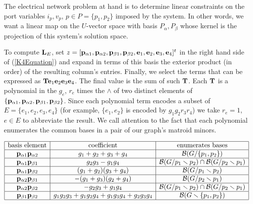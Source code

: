 The electrical network problem at hand is to determine linear constraints on the
port variables $i_p, v_p$, $p\in P = \{p_1, p_2\}$ imposed by the system.  In other words,
we want a linear map on the $U$-vector space with basis $P_\alpha, P_\beta$ whose kernel
is the projection of this system's solution space.

To compute $\mathbf{L}_E$, set 
$z=[\mathbf{p}_{\alpha 1},\mathbf{p}_{\alpha 2},\mathbf{p}_{\beta 1},\mathbf{p}_{\beta 2},
  \mathbf{e}_1,  \mathbf{e}_2,  \mathbf{e}_3,  \mathbf{e}_4]^t$
in the right hand side of (\ref{K4Equation}) 
and expand in terms of this basis
the exterior product (in order) of the resulting column's entries.
Finally, we select
the terms that can be expressed as $\mathbf{T}\mathbf{e}_1\mathbf{e}_2\mathbf{e}_3\mathbf{e}_4$.  The final
value is the sum of such $\mathbf{T}$.  Each $\mathbf{T}$ is a polynomial in the $g_e$, $r_e$
times the $\wedge$ of two distinct elements of
$\{\mathbf{p}_{\alpha 1}, \mathbf{p}_{\alpha 2}, \mathbf{p}_{\beta 1}, \mathbf{p}_{\beta 2}\}$.  Since each polynomial
term encodes a subset of $E=\{e_1, e_2, e_3, e_4\}$ (for example, $\{e_1, e_2\}$ is encoded
by $g_1g_2r_3r_4$) we take $r_e=1$, $e\in E$ to abbreviate the result. We call attention
to the fact that each polynomial enumerates
the common bases in a pair of our graph's matroid minors.


\begin{equation}\label{K4table}
\begin{array}{|c|c|c|} \hline
\text{basis element} & \text{coefficient} & \text{enumerates bases}\\
  \hline

\mathbf{p}_{\alpha 1}\mathbf{p}_{\alpha 2} &
g_1 + g_2 + g_3 + g_4 & \mathcal{B}(G/\{p_1, p_2\})

\\ \hline

\mathbf{p}_{\alpha 1}\mathbf{p}_{\beta 1} &
g_2g_3 - g_1g_4 &  \mathcal{B}(G/p_1\smallsetminus p_2)\cap\mathcal{B}(G/p_2\smallsetminus p_1)

\\ \hline

\mathbf{p}_{\alpha 1}\mathbf{p}_{\beta 2} &
(g_1 + g_2)(g_3 + g_4) & \mathcal{B}(G/p_1\smallsetminus p_2)
\\ \hline 

\mathbf{p}_{\alpha 2}\mathbf{p}_{\beta 1} & -(g_1 + g_3)(g_2+g_4) & \mathcal{B}(G/p_2\smallsetminus p_1)
\\ \hline
 
\mathbf{p}_{\alpha 2}\mathbf{p}_{\beta 2} &
-g_2g_3 + g_1g_4 & \mathcal{B}(G/p_1\smallsetminus p_2)\cap\mathcal{B}(G/p_2\smallsetminus p_1)
\\ \hline
 
\mathbf{p}_{\beta 1}\mathbf{p}_{\beta 2} &
g_1g_2g_3 + g_1g_2g_4 + g_1g_3g_4 + g_2g_3g_4 & \mathcal{B}(G\smallsetminus \{p_1, p_2\})
\\ \hline

\end{array}
\end{equation}
